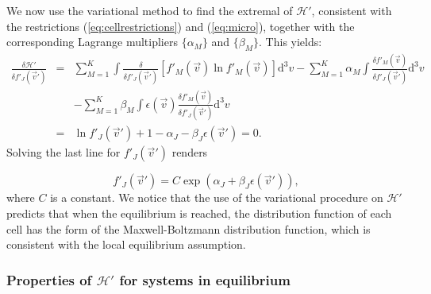 We now use the variational method to find the extremal of $\mathcal{H}'$,
consistent with the restrictions
(\ref{eq:cellrestrictions}) and (\ref{eq:micro}), together with the corresponding Lagrange
multipliers $\{\alpha_M\}$ and $\{\beta_M\}$. This yields:
%
\begin{eqnarray}\label{eq:deltaHpdeltafpj}
    \frac{\delta \mathcal{H}'}{\delta f'_J(\vec{v}')} & = & \sum_{M=1}^{K}\int
      \frac{\delta}{\delta f'_J(\vec{v}')}\left[
        f'_M(\vec{v})\ln f'_M(\vec{v})
        \right]
       \mathrm{d}^3v -\sum_{M=1}^{K}\alpha_M\int
       	\frac{\delta f'_M(\vec{v})}{\delta f'_J(\vec{v}')}
      \mathrm{d}^3v\nonumber\\
    & & -\sum_{M=1}^{K}\beta_M\int\epsilon(\vec{v})
    	\frac{\delta f'_M(\vec{v})}{\delta f'_J(\vec{v}')}
      \mathrm{d}^3v \nonumber\\
    & = & \ln f'_J(\vec{v}')+1-\alpha_J-\beta_J \epsilon(\vec{v}')=0.
\end{eqnarray}
%
Solving the last line for $f'_J(\vec{v}')$ renders
%
\begin{comment}
\begin{eqnarray}
    \ln f'_J(\vec{v}') & = & \alpha_J+\beta_J \epsilon(\vec{v}')
       -1\quad\Rightarrow\quad f_J(\vec{v}')\\
    & = & e^{\alpha_J +\beta_J \epsilon(\vec{v}')-1}\nonumber\\
    & = & Ce^{\alpha_J+\beta_J \epsilon(\vec{v}') } \label{eq:relacion1},
\end{eqnarray}
\end{comment}
\begin{equation}\label{eq:relacion1}
	f'_J(\vec{v}') = C\exp\left({\alpha_J+\beta_J \epsilon(\vec{v}') }\right),
\end{equation}
%
where $C$ is a constant. We notice that the use of the variational procedure on
$\mathcal{H}'$ predicts that when the equilibrium is reached, the
distribution function of each cell has the form of the Maxwell-Boltzmann
distribution function, which is consistent with the local equilibrium assumption.

\subsubsection{Properties of $\mathcal{H}'$ for systems in equilibrium}

